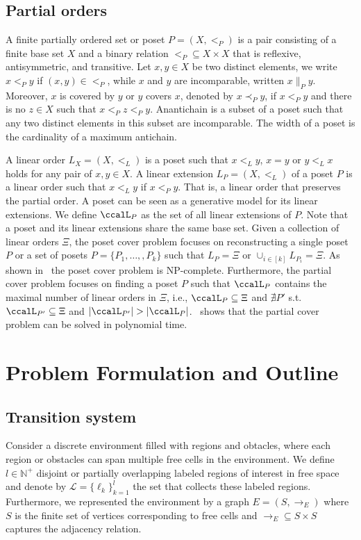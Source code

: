 \documentclass[Afour,sageh,times]{sagej}
\begin{document}
\subsection{Partial orders}\label{sec:partial}
A finite partially ordered set or poset $P = (X, <_P )$  is a pair consisting of a finite base set $X$ and a binary relation $<_P \subseteq X \times X$ that is reflexive, antisymmetric, and transitive. Let  $x, y \in X$ be two distinct elements, we write $x <_P y$ if $(x,y) \in <_P$, while $x$ and $y$ are incomparable, written $x \|_P y$. Moreover, $x$ is covered by $y$ or $y$ covers $x$, denoted by $x \prec_P y$, if $x<_P  y$ and there is no $z \in X$ such that $x  <_P  z <_P y$. Anantichain is a subset of a poset such that any two distinct elements in this subset are incomparable. The width of a poset is the cardinality of a maximum antichain. %

A linear order $L_X=(X, <_L)$ is a poset such that $x <_L y$, $x = y$ or $y <_L x$ holds for any pair of  $x, y \in X$. A linear extension  $L_P = (X, <_L)$ of a poset $P$ is a linear order such that $x <_L y$ if $x <_P y$. That is, a linear order that preserves the partial order. A poset can be seen as a generative model for its linear extensions.
We define $\ccalL_P$ as the set of all linear extensions of $P$. Note that a poset and its linear extensions share the same base set. Given a collection of linear orders $\Xi$, the poset cover problem focuses on reconstructing a single poset $P$ or a set of posets $P = \{P_1,\ldots,,P_k\}$ such that $L_P = \Xi$ or $\cup_{i\in[k]}L_{P_i} = \Xi$. As shown in~\cite{heath2013poset} the poset cover problem is NP-complete. Furthermore, the partial cover problem focuses on finding a poset $P$ such that $\ccalL_P$ contains the maximal number of linear orders in $\Xi$, i.e., $\ccalL_P \subseteq \Xi$ and   $\nexists P'$ s.t. $\ccalL_{P'} \subseteq \Xi$ and $|\ccalL_{P'}| > |\ccalL_{P}|$.~\cite{heath2013poset} shows that the partial cover problem can be solved in polynomial time.

\section{Problem Formulation and Outline}\label{sec:problem}
\subsection{Transition system}\label{sec:ts}
 Consider a discrete environment filled with regions and obtacles, where each region or obstacles can span multiple free cells in the environment. We define $l\in \mathbb{N}^+$ disjoint or partially overlapping labeled regions of interest in free space and denote by $\mathcal{L}=\{\ell_k\}_{k=1}^{l}$ the set that collects these labeled regions. Furthermore, we represented the environment by a graph $E = (S, \to_E)$ where $S$ is the finite set of vertices corresponding to free cells and $\to_{E} \subseteq S \times S$ captures the adjacency relation.
\end{document}
